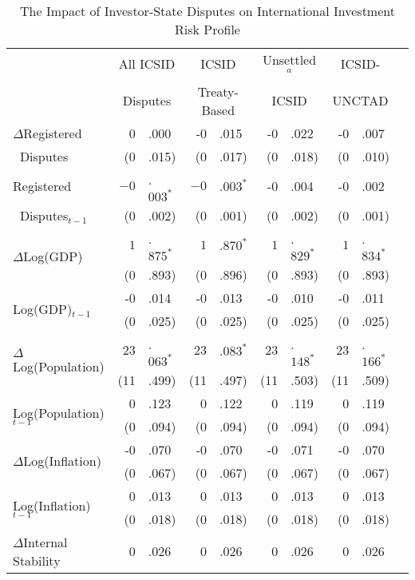 \documentclass[12pt,onesided]{amsart}
\begin{document}
\begin{table}[ht]
\vspace{1cm}
\centering
{\footnotesize
\caption{The Impact of Investor-State Disputes on International Investment Risk Profile}
\label{tab:ecm}
\begin{tabular}{lr@{} lr@{}lr@{}lr@{}lr@{}}
	\hline\hline
	~ & \multicolumn{2}{c}{All ICSID} & \multicolumn{2}{c}{ICSID}  & \multicolumn{2}{c}{Unsettled$^{a}$} & \multicolumn{2}{c}{ICSID-} \\
	~ & \multicolumn{2}{c}{Disputes} & \multicolumn{2}{c}{Treaty-Based} & \multicolumn{2}{c}{ICSID} &  \multicolumn{2}{c}{UNCTAD}  \\
	\hline
  $\Delta$Registered & 0&.000 & -0&.015 & -0&.022 & -0&.007 \\
  $\;\;$Disputes & (0&.015) & (0&.017) & (0&.018) & (0&.010) \\
  Registered & $-0$&.$003^{\ast}$ & $-0$&.$003^{\ast}$ & -0&.004 & -0&.002 \\
  $\;\;$Disputes$_{t-1}$ & (0&.002) &  (0&.001) & (0&.002) & (0&.001) \\
  \multirow{2}{*}{$\Delta$Log(GDP)} & $1$&.$875^{\ast}$ & $1$&.$870^{\ast}$ & $1$&.$829^{\ast}$ & $1$&.$834^{\ast}$ \\
  & (0&.893) & (0&.896) & (0&.893) & (0&.893) \\
  \multirow{2}{*}{Log(GDP)$_{t-1}$} & -0&.014 & -0&.013 & -0&.010 & -0&.011\\
  & (0&.025) & (0&.025) & (0&.025) & (0&.025) \\
  \multirow{2}{*}{$\Delta$Log(Population)} & $23$&.$063^{\ast}$ & $23$&.$083^{\ast}$ & $23$&.$148^{\ast}$ & $23$&.$166^{\ast}$ \\
  & (11&.499) & (11&.497) & (11&.503) & (11&.509)\\
  \multirow{2}{*}{Log(Population)$_{t-1}$} & 0&.123 & 0&.122 & 0&.119 & 0&.119 \\
  & (0&.094) & (0&.094) & (0&.094) & (0&.094) \\
  \multirow{2}{*}{$\Delta$Log(Inflation)} & -0&.070 &  -0&.070 &  -0&.071 &  -0&.070 \\
  & (0&.067) &  (0&.067) &  (0&.067) &  (0&.067) \\
  \multirow{2}{*}{Log(Inflation)$_{t-1}$} & 0&.013 &  0&.013 &  0&.013 &  0&.013 \\
  & (0&.018) &  (0&.018) &  (0&.018) &  (0&.018) \\
  \multirow{2}{*}{$\Delta$Internal Stability} & 0&.026 & 0&.026 &  0&.026 &  0&.026 \\

\end{tabular}}
\end{table}
\end{document}
